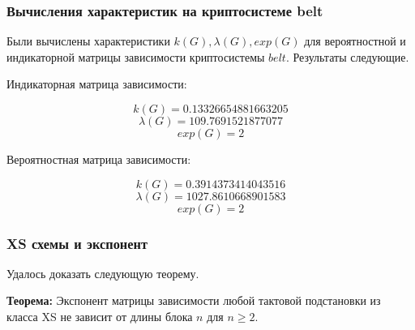 \documentclass{beamer}
\begin{document}
\begin{frame}
    \frametitle{Вычисления характеристик на криптосистеме belt}

Были вычислены характеристики $k(G), \lambda(G), exp(G)$ для вероятностной и индикаторной матрицы зависимости криптосистемы $belt$. Результаты следующие.

Индикаторная матрица зависимости:

$$k(G) = 0.13326654881663205$$
$$\lambda(G) = 109.7691521877077$$
$$exp(G) = 2$$

Вероятностная матрица зависимости:

$$k(G) = 0.3914373414043516$$
$$\lambda(G) = 1027.8610668901583$$
$$exp(G) = 2$$
  \end{frame}


\begin{frame}
    \frametitle{XS схемы и экспонент}
Удалось доказать следующую теорему.

\textbf{Теорема:} Экспонент матрицы зависимости любой тактовой подстановки из класса XS не зависит от длины блока $n$ для $n \ge 2$.

  \end{frame}
\end{document}
